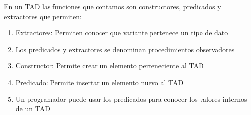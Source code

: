 {
	En un TAD las funciones que contamos son constructores, predicados y extractores que permiten:

	\begin{enumerate}
		\item Extractores: Permiten conocer que variante pertenece un tipo de dato
		\item Los predicados y extractores se denominan procedimientos observadores %
		\item Constructor: Permite crear un elemento perteneciente al TAD %
		\item Predicado: Permite insertar un elemento nuevo al TAD
		\item Un programador puede usar los predicados para conocer los valores internos de un TAD
	\end{enumerate}
}

